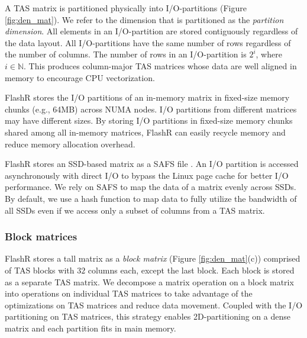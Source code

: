 A TAS matrix is partitioned physically into I/O-partitions (Figure
\ref{fig:den_mat}). We refer to the dimension that is partitioned as
the \textit{partition dimension}. All elements in an I/O-partition are stored
contiguously regardless of the data layout. All I/O-partitions
have the same number of rows regardless of the number of columns.
The number of rows in an I/O-partition is $2^i$, where
$i \in \mathbb{N}$. This produces column-major TAS
matrices whose data are well aligned in memory to encourage CPU vectorization.

FlashR stores the I/O partitions of an in-memory matrix in
fixed-size memory chunks (e.g., 64MB) across NUMA nodes.
I/O partitions from different matrices may have different sizes. By storing
I/O partitions in fixed-size memory chunks shared among all in-memory matrices,
FlashR can easily recycle memory and reduce memory allocation overhead.

FlashR stores an SSD-based matrix as a SAFS file \cite{safs}.
An I/O partition is accessed asynchronously with direct I/O to bypass the Linux
page cache for better I/O performance. We rely on SAFS to map the data of
a matrix evenly across SSDs. By default, we use
a hash function to map data to fully utilize the bandwidth of all SSDs
even if we access only a subset of columns from a TAS matrix.

\subsubsection{Block matrices} \label{sec:block_mat}
FlashR stores a tall matrix as a \textit{block matrix}
(Figure \ref{fig:den_mat}(c)) comprised of TAS blocks with $32$ columns each,
except the last block. Each block is stored as a separate TAS matrix.
We decompose a matrix operation
on a block matrix into operations on individual TAS matrices to take advantage
of the optimizations on TAS matrices and reduce data movement.
Coupled with the I/O partitioning on TAS matrices, this strategy enables
2D-partitioning on a dense matrix and each partition fits in main memory.



